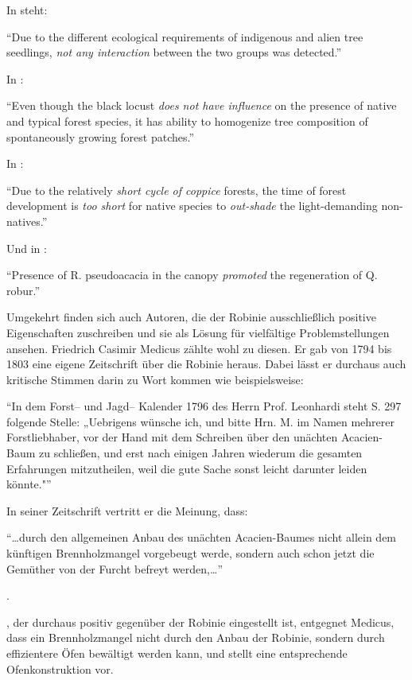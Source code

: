 \documentclass[twocolumn]{scrartcl}
\begin{document}
In \citet{maringer2012robinePostFire} steht:

\enquote{Due to the different ecological requirements of indigenous
  and alien tree seedlings, \emph{not any interaction} between the two
  groups was detected.}

In \citet{petrasova2013neophyten}:

\enquote{Even though the black locust \emph{does not have influence}
  on the presence of native and typical forest species, it has ability
  to homogenize tree composition of spontaneously growing forest
  patches.}

In \citet{radtke2013robinieNiederwald}:

\enquote{Due to the relatively \emph{short cycle of coppice} forests,
  the time of forest development is \emph{too short} for native
  species to \emph{out-shade} the light-demanding non-natives.}

Und in \citet{terwei2013nonNative}:

\enquote{Presence of R. pseudoacacia in the canopy \emph{promoted} the
  regeneration of Q. robur.}

Umgekehrt finden sich auch Autoren, die der Robinie ausschließlich
positive Eigenschaften zuschreiben und sie als Lösung für vielfältige
Problemstellungen ansehen. Friedrich Casimir Medicus zählte wohl zu
diesen. Er gab von 1794 bis 1803 eine eigene Zeitschrift über die
Robinie heraus. Dabei lässt er durchaus auch kritische Stimmen darin
zu Wort kommen wie beispielsweise:

\hypertarget{german:medicus1794ffRobinie}{\enquote{In dem Forst-- und Jagd-- Kalender 1796 des Herrn Prof. Leonhardi steht S. 297 folgende Stelle: „Uebrigens wünsche ich, und bitte Hrn. M. im Namen mehrerer Forstliebhaber, vor der Hand mit dem Schreiben über den unächten Acacien-Baum zu schließen, und erst nach einigen Jahren wiederum die gesamten Erfahrungen mitzutheilen, weil die gute Sache sonst leicht darunter leiden könnte."}} \citep[Bd. 2, Nr. 2, S. 3]{medicus1794ffRobinie}

In seiner Zeitschrift vertritt er die Meinung, dass:

\hypertarget{german:medicus1794ffRobinieB}{\enquote{\dots durch den allgemeinen Anbau des unächten Acacien-Baumes
  nicht allein dem künftigen Brennholzmangel vorgebeugt werde, sondern
  auch schon jetzt die Gemüther von der Furcht befreyt werden,\dots}}
\citep[Bd. 1, Nr. 3, S. 186]{medicus1794ffRobinie}.

\citet{hartig1798robinie}, der durchaus positiv gegenüber der Robinie
eingestellt ist, entgegnet Medicus, dass ein Brennholzmangel nicht
durch den Anbau der Robinie, sondern durch effizientere Öfen bewältigt
werden kann, und stellt eine entsprechende Ofenkonstruktion vor.
\end{document}

